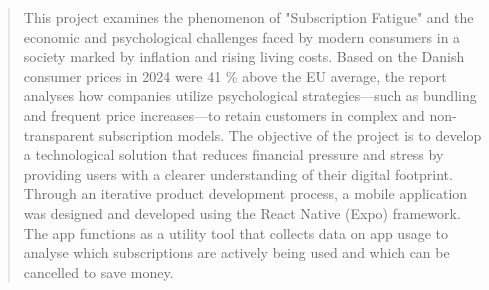 \begin{abstract}
This project examines the phenomenon of "Subscription Fatigue" and the economic and psychological challenges faced by modern consumers in a society marked by inflation and rising living costs. Based on the Danish consumer prices in 2024 were 41 \% above the EU average, the report analyses how companies utilize psychological strategies—such as bundling and frequent price increases—to retain customers in complex and non-transparent subscription models.
The objective of the project is to develop a technological solution that reduces financial pressure and stress by providing users with a clearer understanding of their digital footprint. Through an iterative product development process, a mobile application was designed and developed using the React Native (Expo) framework. The app functions as a utility tool that collects data on app usage to analyse which subscriptions are actively being used and which can be cancelled to save money.
\end{abstract}
    
    
    
 
